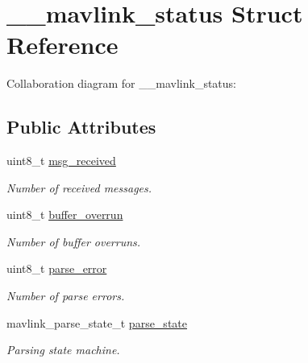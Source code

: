 \hypertarget{struct____mavlink__status}{}\section{\+\_\+\+\_\+mavlink\+\_\+status Struct Reference}
\label{struct____mavlink__status}


Collaboration diagram for \+\_\+\+\_\+mavlink\+\_\+status\+:
\subsection*{Public Attributes}
\begin{DoxyCompactItemize}
\item 
\hypertarget{struct____mavlink__status_a183576e45facc9da8123b7866d458680}{}\label{struct____mavlink__status_a183576e45facc9da8123b7866d458680} 
uint8\+\_\+t \hyperlink{struct____mavlink__status_a183576e45facc9da8123b7866d458680}{msg\+\_\+received}
\begin{DoxyCompactList}\small\item\em Number of received messages. \end{DoxyCompactList}\item 
\hypertarget{struct____mavlink__status_ae0ceb5a136021ee78c953f2e86d772cb}{}\label{struct____mavlink__status_ae0ceb5a136021ee78c953f2e86d772cb} 
uint8\+\_\+t \hyperlink{struct____mavlink__status_ae0ceb5a136021ee78c953f2e86d772cb}{buffer\+\_\+overrun}
\begin{DoxyCompactList}\small\item\em Number of buffer overruns. \end{DoxyCompactList}\item 
\hypertarget{struct____mavlink__status_ae7a52aa0c84929dbf181220c689f9ec8}{}\label{struct____mavlink__status_ae7a52aa0c84929dbf181220c689f9ec8} 
uint8\+\_\+t \hyperlink{struct____mavlink__status_ae7a52aa0c84929dbf181220c689f9ec8}{parse\+\_\+error}
\begin{DoxyCompactList}\small\item\em Number of parse errors. \end{DoxyCompactList}\item 
\hypertarget{struct____mavlink__status_aaf6742a61bbc641a4600184b3260fa0f}{}\label{struct____mavlink__status_aaf6742a61bbc641a4600184b3260fa0f} 
mavlink\+\_\+parse\+\_\+state\+\_\+t \hyperlink{struct____mavlink__status_aaf6742a61bbc641a4600184b3260fa0f}{parse\+\_\+state}
\begin{DoxyCompactList}\small\item\em Parsing state machine. \end{DoxyCompactList}\item 

\end{DoxyCompactItemize}

